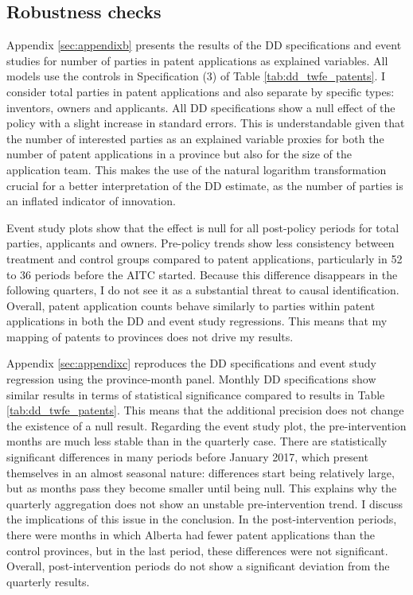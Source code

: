 \documentclass[../main.tex]{subfiles}
\begin{document}
\subsection{Robustness checks}

Appendix \ref{sec:appendixb} presents the results of the DD specifications and event studies for number of parties in patent applications as explained variables. All models use the controls in Specification (3) of Table \ref{tab:dd_twfe_patents}. I consider total parties in patent applications and also separate by specific types: inventors, owners and applicants. All DD specifications show a null effect of the policy with a slight increase in standard errors. This is understandable given that the number of interested parties as an explained variable proxies for both the number of patent applications in a province but also for the size of the application team. This makes the use of the natural logarithm transformation crucial for a better interpretation of the DD estimate, as the number of parties is an inflated indicator of innovation. 

Event study plots show that the effect is null for all post-policy periods for total parties, applicants and owners. Pre-policy trends show less consistency between treatment and control groups compared to patent applications, particularly in 52 to 36 periods before the AITC started. Because this difference disappears in the following quarters, I do not see it as a substantial threat to causal identification. Overall, patent application counts behave similarly to parties within patent applications in both the DD and event study regressions. This means that my mapping of patents to provinces does not drive my results.

Appendix \ref{sec:appendixc} reproduces the DD specifications and event study regression using the province-month panel. Monthly DD specifications show similar results in terms of statistical significance compared to results in Table \ref{tab:dd_twfe_patents}. This means that the additional precision does not change the existence of a null result. Regarding the event study plot, the pre-intervention months are much less stable than in the quarterly case. There are statistically significant differences in many periods before January 2017, which present themselves in an almost seasonal nature: differences start being relatively large, but as months pass they become smaller until being null. This explains why the quarterly aggregation does not show an unstable pre-intervention trend. I discuss the implications of this issue in the conclusion. In the post-intervention periods, there were months in which Alberta had fewer patent applications than the control provinces, but in the last period, these differences were not significant. Overall, post-intervention periods do not show a significant deviation from the quarterly results.
\end{document}
